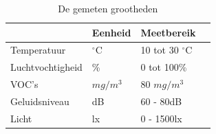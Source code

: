 \begin{table}[ht]
    \centering
    \begin{tabular}{l||l|l|l}
        & Eenheid & Meetbereik\\
        \hline
        Temperatuur      & $^{\circ}$C & 10 tot 30 $^{\circ}$C & \cite{palonen1993effects}  \\
        Luchtvochtigheid & \%          & 0 tot 100\%           & \cite{palonen1993effects}  \\
        VOC's            & \(mg/m^3\)  & 80 \(mg/m^3\)         & \cite{voc-luchtkwaliteit}  \\
        Geluidsniveau    & dB          & 60 - 80dB             & \cite{geluid-levels}       \\
        Licht            & lx          & 0 - 1500lx            & \cite{lightingIndorWorkspaces}
    \end{tabular}
    \caption{De gemeten grootheden}
    \label{tab:grootheden}
\end{table}

 